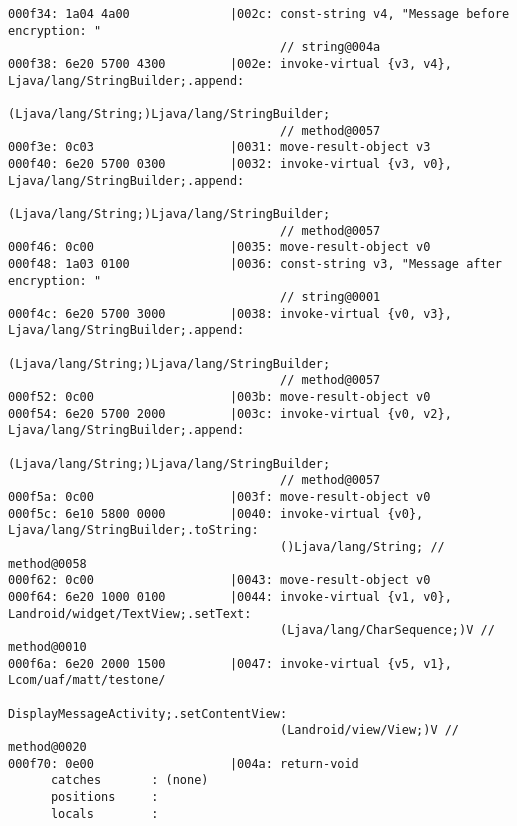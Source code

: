 \begin{lstlisting}
000f34: 1a04 4a00              |002c: const-string v4, "Message before encryption: "
                                      // string@004a
000f38: 6e20 5700 4300         |002e: invoke-virtual {v3, v4}, Ljava/lang/StringBuilder;.append:
                                      (Ljava/lang/String;)Ljava/lang/StringBuilder;
                                      // method@0057
000f3e: 0c03                   |0031: move-result-object v3
000f40: 6e20 5700 0300         |0032: invoke-virtual {v3, v0}, Ljava/lang/StringBuilder;.append:
                                      (Ljava/lang/String;)Ljava/lang/StringBuilder;
                                      // method@0057
000f46: 0c00                   |0035: move-result-object v0
000f48: 1a03 0100              |0036: const-string v3, "Message after encryption: "
                                      // string@0001
000f4c: 6e20 5700 3000         |0038: invoke-virtual {v0, v3}, Ljava/lang/StringBuilder;.append:
                                      (Ljava/lang/String;)Ljava/lang/StringBuilder;
                                      // method@0057
000f52: 0c00                   |003b: move-result-object v0
000f54: 6e20 5700 2000         |003c: invoke-virtual {v0, v2}, Ljava/lang/StringBuilder;.append:
                                      (Ljava/lang/String;)Ljava/lang/StringBuilder;
                                      // method@0057
000f5a: 0c00                   |003f: move-result-object v0
000f5c: 6e10 5800 0000         |0040: invoke-virtual {v0}, Ljava/lang/StringBuilder;.toString:
                                      ()Ljava/lang/String; // method@0058
000f62: 0c00                   |0043: move-result-object v0
000f64: 6e20 1000 0100         |0044: invoke-virtual {v1, v0}, Landroid/widget/TextView;.setText:
                                      (Ljava/lang/CharSequence;)V // method@0010
000f6a: 6e20 2000 1500         |0047: invoke-virtual {v5, v1}, Lcom/uaf/matt/testone/
                                      DisplayMessageActivity;.setContentView:
                                      (Landroid/view/View;)V // method@0020
000f70: 0e00                   |004a: return-void
      catches       : (none)
      positions     :
      locals        :


\end{lstlisting}
